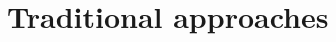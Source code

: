 \section{Traditional approaches}
\label{sec:Traditional approaches}

\citet{schuldt2004recognizing}

\citet{gorelick2007actions}

\citet{marszalek2009actions}

\citet{Soomro2014}